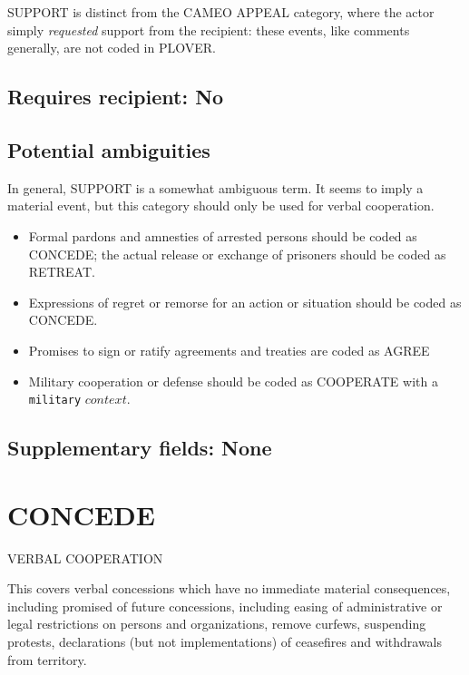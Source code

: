 \documentclass[11pt]{report}
\newcommand{\plcat}[1]{\textsf{#1}}
\newcommand{\txt}[1]{\texttt{#1}}
\begin{document}
\plcat{SUPPORT} is distinct from the CAMEO \plcat{APPEAL} category, where the actor simply \textit{requested} support from the recipient: these events, like comments generally, are not coded in PLOVER.
 
\subsection{Requires recipient: No}

\subsection{Potential ambiguities}

In general, \plcat{SUPPORT} is a somewhat ambiguous term. It seems to imply a material event, but this category should only be used for verbal cooperation.

\begin{itemize}
\item Formal pardons and amnesties of arrested persons should be coded as \plcat{CONCEDE}; the actual release  or exchange of prisoners should be coded as \plcat{RETREAT}.

\item Expressions of regret or remorse for an action or situation should be coded as \plcat{CONCEDE}.

\item Promises to sign or ratify agreements and treaties are coded as \plcat{AGREE}

\item Military cooperation or defense should be coded as \plcat{COOPERATE} with a \txt{military} $context.$
\end{itemize}

\subsection{Supplementary fields: None}


\newpage

\section{CONCEDE}

\textsf{VERBAL COOPERATION} \vspace{8pt}


This covers verbal concessions which have no immediate material consequences, including promised of future concessions, including easing of administrative or legal restrictions on persons and organizations, remove curfews, suspending protests, declarations (but not implementations) of ceasefires and withdrawals from territory.
\end{document}
